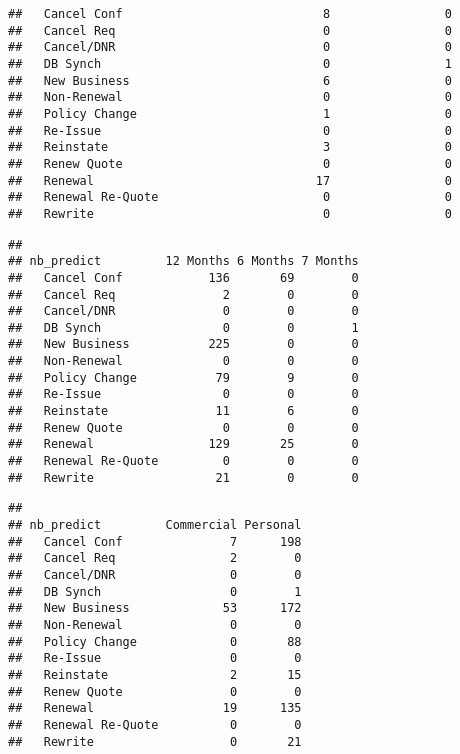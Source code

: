 \documentclass[]{article}
\newenvironment{Shaded}{\begin{snugshade}}{\end{snugshade}}
\newcommand{\CommentTok}[1]{\textcolor[rgb]{0.56,0.35,0.01}{\textit{#1}}}
\newcommand{\KeywordTok}[1]{\textcolor[rgb]{0.13,0.29,0.53}{\textbf{#1}}}
\newcommand{\NormalTok}[1]{#1}
\newcommand{\OperatorTok}[1]{\textcolor[rgb]{0.81,0.36,0.00}{\textbf{#1}}}
\begin{document}
\begin{verbatim}
##   Cancel Conf                            8                0
##   Cancel Req                             0                0
##   Cancel/DNR                             0                0
##   DB Synch                               0                1
##   New Business                           6                0
##   Non-Renewal                            0                0
##   Policy Change                          1                0
##   Re-Issue                               0                0
##   Reinstate                              3                0
##   Renew Quote                            0                0
##   Renewal                               17                0
##   Renewal Re-Quote                       0                0
##   Rewrite                                0                0
\end{verbatim}

\begin{Shaded}
\end{Shaded}

\begin{verbatim}
##                   
## nb_predict         12 Months 6 Months 7 Months
##   Cancel Conf            136       69        0
##   Cancel Req               2        0        0
##   Cancel/DNR               0        0        0
##   DB Synch                 0        0        1
##   New Business           225        0        0
##   Non-Renewal              0        0        0
##   Policy Change           79        9        0
##   Re-Issue                 0        0        0
##   Reinstate               11        6        0
##   Renew Quote              0        0        0
##   Renewal                129       25        0
##   Renewal Re-Quote         0        0        0
##   Rewrite                 21        0        0
\end{verbatim}

\begin{Shaded}
\end{Shaded}

\begin{verbatim}
##                   
## nb_predict         Commercial Personal
##   Cancel Conf               7      198
##   Cancel Req                2        0
##   Cancel/DNR                0        0
##   DB Synch                  0        1
##   New Business             53      172
##   Non-Renewal               0        0
##   Policy Change             0       88
##   Re-Issue                  0        0
##   Reinstate                 2       15
##   Renew Quote               0        0
##   Renewal                  19      135
##   Renewal Re-Quote          0        0
##   Rewrite                   0       21
\end{verbatim}
\end{document}
